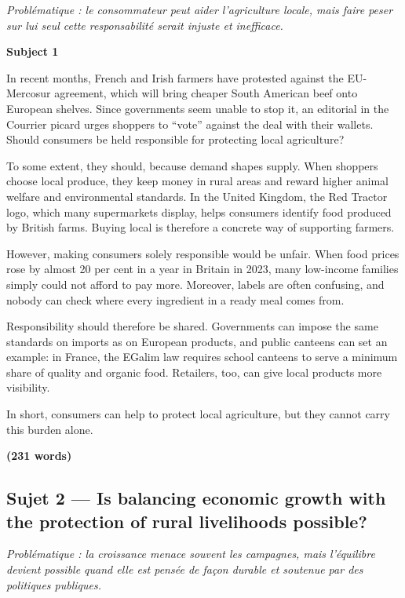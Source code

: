 \documentclass[11pt,a4paper]{article}
\begin{document}
\emph{Problématique : le consommateur peut aider l'agriculture locale, mais faire peser sur lui seul cette responsabilité serait injuste et inefficace.}

\textbf{Subject 1}

In recent months, French and Irish farmers have protested against the EU-Mercosur agreement, which will bring cheaper South American beef onto European shelves. Since governments seem unable to stop it, an editorial in the Courrier picard urges shoppers to ``vote'' against the deal with their wallets. Should consumers be held responsible for protecting local agriculture?

To some extent, they should, because demand shapes supply. When shoppers choose local produce, they keep money in rural areas and reward higher animal welfare and environmental standards. In the United Kingdom, the Red Tractor logo, which many supermarkets display, helps consumers identify food produced by British farms. Buying local is therefore a concrete way of supporting farmers.

However, making consumers solely responsible would be unfair. When food prices rose by almost 20 per cent in a year in Britain in 2023, many low-income families simply could not afford to pay more. Moreover, labels are often confusing, and nobody can check where every ingredient in a ready meal comes from.

Responsibility should therefore be shared. Governments can impose the same standards on imports as on European products, and public canteens can set an example: in France, the EGalim law requires school canteens to serve a minimum share of quality and organic food. Retailers, too, can give local products more visibility.

In short, consumers can help to protect local agriculture, but they cannot carry this burden alone.

\textbf{(231 words)}

\hypertarget{sujet-2-is-balancing-economic-growth-with-the-protection-of-rural-livelihoods-possible}{%
\subsection{Sujet 2 --- Is balancing economic growth with the protection of rural livelihoods possible?}\label{sujet-2-is-balancing-economic-growth-with-the-protection-of-rural-livelihoods-possible}}

\emph{Problématique : la croissance menace souvent les campagnes, mais l'équilibre devient possible quand elle est pensée de façon durable et soutenue par des politiques publiques.}
\end{document}
